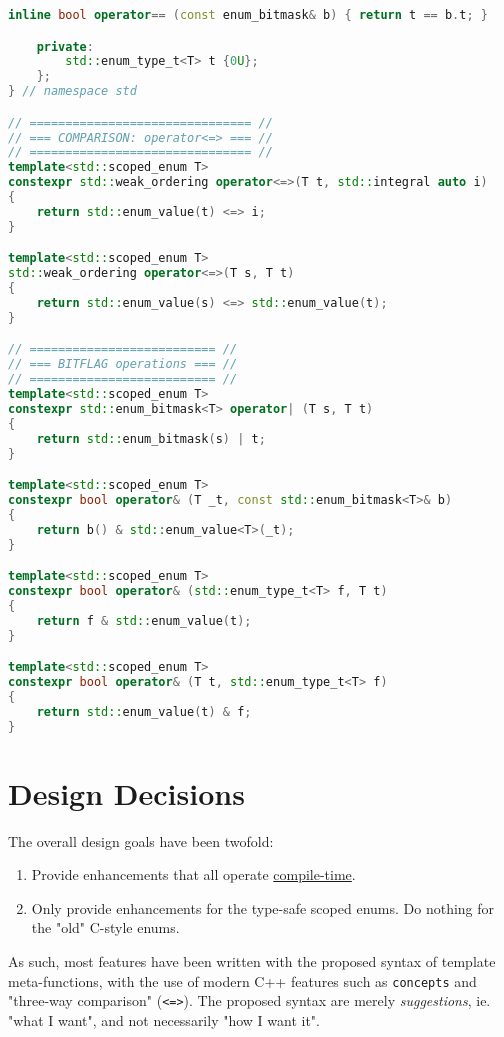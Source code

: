 \documentclass[
  format=manuscript,
  screen=true,
  review=false,
  nonacm=true,
  timestamp=true,
  balance=false]{acmart}
\begin{document}
\begin{lstlisting}[language=Cpp]
        inline bool operator== (const enum_bitmask& b) { return t == b.t; }

    private:
        std::enum_type_t<T> t {0U};
    };
} // namespace std

// =============================== //
// === COMPARISON: operator<=> === //
// =============================== //
template<std::scoped_enum T>
constexpr std::weak_ordering operator<=>(T t, std::integral auto i)
{
    return std::enum_value(t) <=> i;
}

template<std::scoped_enum T>
std::weak_ordering operator<=>(T s, T t)
{
    return std::enum_value(s) <=> std::enum_value(t);
}

// ========================== //
// === BITFLAG operations === //
// ========================== //
template<std::scoped_enum T>
constexpr std::enum_bitmask<T> operator| (T s, T t)
{
    return std::enum_bitmask(s) | t;
}

template<std::scoped_enum T>
constexpr bool operator& (T _t, const std::enum_bitmask<T>& b)
{
    return b() & std::enum_value<T>(_t);
}

template<std::scoped_enum T>
constexpr bool operator& (std::enum_type_t<T> f, T t)
{
    return f & std::enum_value(t);
}

template<std::scoped_enum T>
constexpr bool operator& (T t, std::enum_type_t<T> f)
{
    return std::enum_value(t) & f;
}

\end{lstlisting}



\section{Design Decisions}

The overall design goals have been twofold:

\begin{enumerate}
\item Provide enhancements that all operate \underline{compile-time}.
\item Only provide enhancements for the type-safe scoped enums. Do nothing for the "old" C-style enums.
\end{enumerate}

\noindent
As such, most features have been written with the proposed syntax of template
meta-functions, with the use of modern C++ features such as \texttt{concepts} and
"three-way comparison" (\texttt{<=>}). The proposed syntax are merely
\textit{suggestions}, ie. "what I want", and not necessarily "how I want it".
\end{document}

